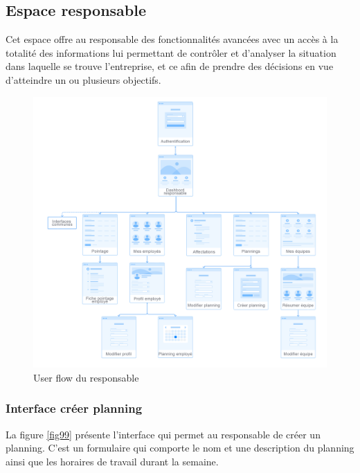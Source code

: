 \subsection{Espace responsable}
Cet espace offre au responsable des fonctionnalités avancées avec un accès à la
totalité des informations lui permettant de contrôler et d’analyser la situation
dans laquelle se trouve l’entreprise, et ce afin de prendre des décisions en vue
d’atteindre un ou plusieurs objectifs.

\clearpage
\begin{figure}[h!]
    \centering
    \includegraphics[scale=0.3]{images/interface/Espace responsable.png}
    \caption{User flow du responsable}
    \label{fig98}
\end{figure}

\subsubsection*{Interface créer planning}
La figure \ref{fig99} présente l'interface qui permet au responsable de créer un
planning. C'est un formulaire qui comporte le nom et une description du planning
ainsi que les horaires de travail durant la semaine.

\clearpage

